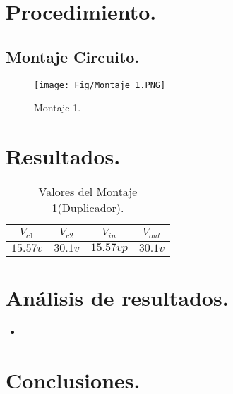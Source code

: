\documentclass[journal]{IEEEtran}
\begin{document}
\section{\textbf{Procedimiento.}}
    \subsection{Montaje Circuito.}    

   
        \begin{figure}[ht]
            \centering
            \texttt{[image: Fig/Montaje 1.PNG]}
            \caption{Montaje 1.}
            \label{montaje1.}
        \end{figure}
    
    
    
\section{\textbf{Resultados.}}

    \begin{table}[ht]
                \begin{center}
                    \begin{tabular}{ |c|c|c|c| } 
                        \hline
                        $V_{c1}$&$V_{c2}$ &$V_{in}$ &$V_{out}$ \\
                        \hline
                        $15.57v$& $30.1v$ & $15.57vp$ & $30.1v $\\ 
                        \hline
                    \end{tabular}
                \end{center} 
                \caption{Valores del Montaje 1(Duplicador).}
                \label{tabla:1}
        \end{table}
        
\section{\textbf{Análisis de resultados.}}
    \begin{itemize}
        \item 
    \end{itemize}
\section{\textbf{Conclusiones.}}






\end{document}
